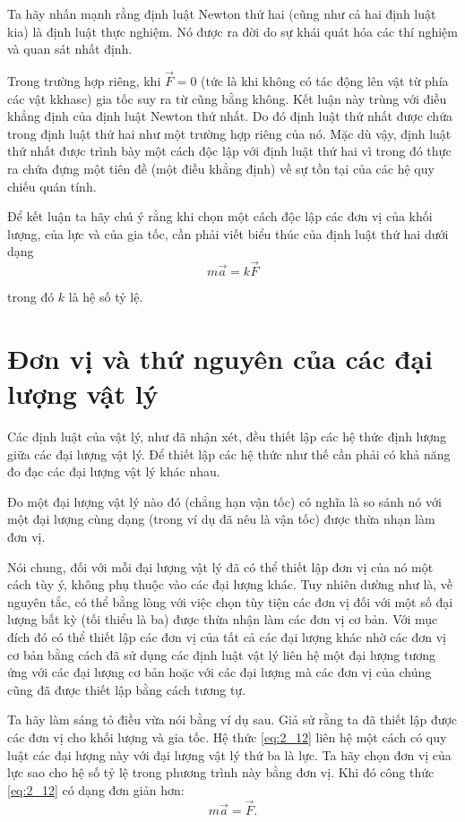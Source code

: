 Ta hãy nhấn mạnh rằng định luật Newton thứ hai (cũng như cả hai định luật kia) là định luật thực nghiệm. Nó được ra đời do sự khái quát hóa các thí nghiệm và quan sát nhất định.

Trong trường hợp riêng, khi $\vec{F}=0$ (tức là khi không có tác động lên vật từ phía các vật kkhasc) gia tốc suy ra từ  cũng bằng không. Kết luận này trùng với điều khẳng định của định luật Newton thứ nhất. Do đó định luật thứ nhất được chứa trong định luật thứ hai như một trường hợp riêng của nó. Mặc dù vậy, định luật thứ nhất được trình bày một cách độc lập với định luật thứ hai vì trong đó thực ra chứa đựng một tiên đề (một điều khẳng định) về sự tồn tại của các hệ quy chiếu quán tính.

Để kết luận ta hãy chú ý rằng khi chọn một cách độc lập các đơn vị của khối lượng, của lực và của gia tốc, cần phải viết biểu thúc của định luật thứ hai dưới dạng
\begin{equation}\label{eq:2_12}
m\vec{a} = k\vec{F}
\end{equation}

\noindent
trong đó $k$ là hệ số tỷ lệ.

\section{Đơn vị và thứ nguyên của các đại lượng vật lý}\label{sec:2_5}

Các định luật của vật lý, như đã nhận xét, đều thiết lập các hệ thức định lượng giữa các đại lượng vật lý. Để thiết lập các hệ thức như thế cần phải có khả năng đo đạc các đại lượng vật lý khác nhau.

Đo một đại lượng vật lý nào đó (chẳng hạn vận tốc) có nghĩa là so sánh nó với một đại lượng cùng dạng (trong ví dụ đã nêu là vận tốc) được thừa nhạn làm đơn vị.

Nói chung, đối với mỗi đại lượng vật lý đã có thể thiết lập đơn vị của nó một cách tùy ý, không phụ thuộc vào các đại lượng khác. Tuy nhiên dường như là, về nguyên tắc, có thể bằng lòng với việc chọn tùy tiện các đơn vị đối với một số đại lượng bất kỳ (tối thiểu là ba) được thừa nhận làm các đơn vị cơ bản. Với mục đích đó có thể thiết lập các đơn vị của tất cả các đại lượng khác nhờ các đơn vị cơ bản bằng cách đã sử dụng các định luật vật lý liên hệ một đại lượng tương ứng với các đại lượng cơ bản hoặc với các đại lượng mà các đơn vị của chúng cũng đã được thiết lập bằng cách tương tự.

Ta hãy làm sáng tỏ điều vừa nói bằng ví dụ sau. Giả sử rằng ta đã thiết lập được các đơn vị cho khối lượng và gia tốc. Hệ thức \eqref{eq:2_12} liên hệ một cách có quy luật các đại lượng này với đại lượng vật lý thứ ba là lực. Ta hãy chọn đơn vị của lực sao cho hệ số tỷ lệ trong phương trình này bằng đơn vị. Khi đó công thức \eqref{eq:2_12} có dạng đơn giản hơn:
\begin{equation}\label{eq:2_13}
m\vec{a} = \vec{F}.
\end{equation}

